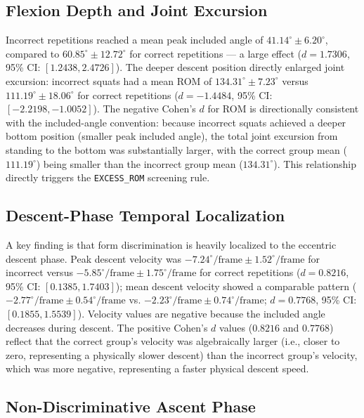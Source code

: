 \subsection{Flexion Depth and Joint Excursion}
\label{sec:4-2-1-flexion-depth-and-joint-excursion}

Incorrect repetitions reached a mean peak included angle of $\mathbf{41.14^\circ \pm 6.20^\circ}$, compared to $\mathbf{60.85^\circ \pm 12.72^\circ}$ for correct repetitions — a large effect ($d = 1.7306$, 95\% CI: $[1.2438, 2.4726]$). The deeper descent position directly enlarged joint excursion: incorrect squats had a mean ROM of $\mathbf{134.31^\circ \pm 7.23^\circ}$ versus $\mathbf{111.19^\circ \pm 18.06^\circ}$ for correct repetitions ($d = -1.4484$, 95\% CI: $[-2.2198, -1.0052]$). The negative Cohen's $d$ for ROM is directionally consistent with the included-angle convention: because incorrect squats achieved a deeper bottom position (smaller peak included angle), the total joint excursion from standing to the bottom was substantially larger, with the correct group mean ($111.19^\circ$) being smaller than the incorrect group mean ($134.31^\circ$). This relationship directly triggers the \texttt{EXCESS\_ROM} screening rule.

\subsection{Descent-Phase Temporal Localization}
\label{sec:4-2-2-descent-phase-temporal-localization}

A key finding is that form discrimination is heavily localized to the eccentric descent phase. Peak descent velocity was $-7.24^\circ/\text{frame} \pm 1.52^\circ/\text{frame}$ for incorrect versus $-5.85^\circ/\text{frame} \pm 1.75^\circ/\text{frame}$ for correct repetitions ($d = 0.8216$, 95\% CI: $[0.1385, 1.7403]$); mean descent velocity showed a comparable pattern ($-2.77^\circ/\text{frame} \pm 0.54^\circ/\text{frame}$ vs. $-2.23^\circ/\text{frame} \pm 0.74^\circ/\text{frame}$; $d = 0.7768$, 95\% CI: $[0.1855, 1.5539]$). Velocity values are negative because the included angle decreases during descent. The positive Cohen's $d$ values ($0.8216$ and $0.7768$) reflect that the correct group's velocity was algebraically larger (i.e., closer to zero, representing a physically slower descent) than the incorrect group's velocity, which was more negative, representing a faster physical descent speed.

\subsection{Non-Discriminative Ascent Phase}
\label{sec:4-2-3-non-discriminative-ascent-phase}

